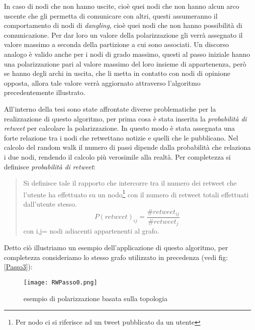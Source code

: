 In caso di nodi che non hanno uscite, cioè quei nodi che non hanno alcun arco uscente che gli permetta di comunicare con altri, questi assumeranno il comportamento di nodi di \textit{dangling}, cioè quei nodi che non hanno possibilità di comunicazione. Per dar loro un valore della polarizzazione gli verrà assegnato il valore massimo a seconda della partizione a cui sono associati.
Un discorso analogo è valido anche per i nodi di grado massimo, questi al passo iniziale hanno una polarizzazione pari al valore massimo del loro insieme di appartenenza, però se hanno degli archi in uscita, che li metta in contatto con nodi di opinione opposta, allora tale valore verrà aggiornato attraverso l'algoritmo precedentemente illustrato.


All'interno della tesi sono state affrontate diverse problematiche per la realizzazione di questo algoritmo, per prima cosa è stata inserita la \textit{probabilità di retweet} per calcolare la polarizzazione. In questo modo è stata assegnata una forte relazione tra i nodi che retwettano notizie e quelli che le pubblicano. Nel calcolo del random walk il numero di passi dipende dalla probabilità che relaziona i due nodi, rendendo il calcolo più verosimile alla realtà.
Per completezza si definisce \textit{probabilità di retweet}:
\begin{quote}
Si definisce tale il rapporto che intercorre tra il numero dei retweet che l'utente ha effettuato su un nodo\footnote{Per nodo ci si riferisce ad un tweet pubblicato da un utente} con il numero di retweet totali effettuati dall'utente stesso.
\begin{equation}
 P(retweet)_{ij} = \dfrac{\#retweet_{ij}}{\#retweet_{j}} 
\end{equation}
 con i,j= nodi adiacenti appartenenti al grafo.
 \end{quote}

Detto ciò illustriamo un esempio dell'applicazione di questo algoritmo, per completezza consideriamo lo stesso grafo utilizzato in precedenza (vedi fig:\ref{Passo3}):
\begin{figure}[htbp]
    \begin{center}
      \texttt{[image: RWPasso0.png]}
		\caption{esempio di polarizzazione basata sulla topologia}
	\label{RandomWalk}
    \end{center}
  \end{figure}

